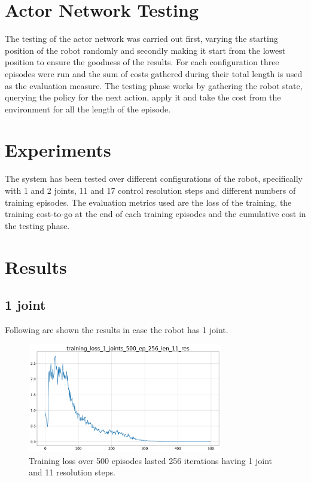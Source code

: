 \documentclass[twocolumn, a4paper]{article}
\begin{document}
\section{Actor Network Testing}
The testing of the actor network was carried out first, varying the starting
position of the robot randomly and secondly making it start from the lowest
position to ensure the goodness of the results.
For each configuration three episodes were run and the sum of costs gathered
during their total length is used as the evaluation measure.
The testing phase works by gathering the robot state, querying the policy
for the next action, apply it and take the cost from the environment for all
the length of the episode.

\section{Experiments}
The system has been tested over different configurations of the robot,
specifically with 1 and 2 joints, 11 and 17 control resolution steps and
different numbers of training episodes.
The evaluation metrics used are the loss of the training, the training
cost-to-go at the end of each training episodes and the cumulative cost in the
testing phase.

\section{Results}
\subsection{1 joint}
Following are shown the results in case the robot has 1 joint.

\begin{figure}[H]
	\centering
	\includegraphics[width=8.5cm]{"../Figures/training_loss_1J_500E_256EL_11RES.png"}
	\caption{Training loss over 500 episodes lasted 256 iterations having 1
			 joint and 11 resolution steps.}
	\label{fig:TrainLoss_1_500_11}
\end{figure}
\end{document}
